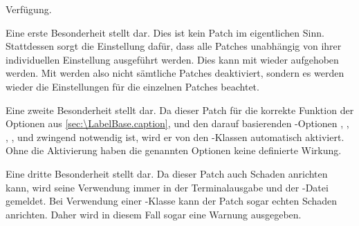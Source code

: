 \begin{table}
\begin{desctabular}
{      Verfügung.%
    }%
  \end{desctabular}
\end{table}

Eine erste Besonderheit stellt
%
 dar. Dies ist kein Patch im eigentlichen
Sinn. Stattdessen sorgt die Einstellung dafür, dass alle Patches unabhängig
von ihrer individuellen Einstellung ausgeführt werden. Dies kann mit
%
 wieder aufgehoben
werden. Mit  werden also
nicht sämtliche Patches deaktiviert, sondern es werden wieder die
Einstellungen für die einzelnen Patches beachtet.

Eine zweite Besonderheit stellt %
%
 dar. Da dieser Patch für die korrekte
Funktion der Optionen aus \autoref{sec:\LabelBase.caption},
 und den darauf basierenden
\KOMAScript-Optionen ,
,
,
,
 und
 zwingend notwendig ist,
wird er von den \KOMAScript-Klassen automatisch aktiviert. Ohne die
Aktivierung haben die genannten Optionen keine definierte
Wirkung.

Eine dritte Besonderheit stellt %
%
 dar. Da dieser Patch auch Schaden
anrichten kann, wird seine Verwendung immer in der Terminalausgabe und der
-Datei gemeldet. Bei Verwendung einer \KOMAScript-Klasse kann der
Patch sogar echten Schaden anrichten. Daher wird in diesem Fall sogar eine
Warnung ausgegeben.

